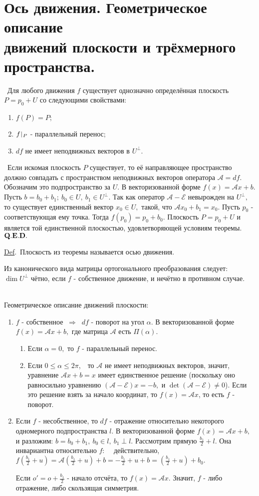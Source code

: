 \documentclass[a4paper]{article}%
\renewcommand{\de}{\par\noindent\underline{Def}.\ }%
\renewcommand{\ab}{\par\noindent}%
\newcommand{\te}{\par\noindent{\bf Теорема.}\ }%
\newcommand{\dok}{\par\noindent{\textsl{Доказательство}.}\ }%
\newcommand{\qed}{\quad${{\bf Q.E.D.}}$}
\renewcommand{\om}[1]{\mathcal{#1}}
\renewcommand{\le}{\leqslant}
\begin{document}
\section{Ось движения. Геометрическое описание\\ движений плоскости и трёхмерного пространства.}
\label{q48}
\te Для любого движения $f$ существует однозначно определённая плоскость $P=p_0+U$ со следующими свойствами:
\begin{enumerate}
    \item $f(P)=P;$
    \item $f\,\vrule\,_P$ - параллельный перенос;
    \item $df$ не имеет неподвижных векторов в $U^\bot.$
\end{enumerate}
\dok Если искомая плоскость $P$ существует, то её направляющее пространство должно совпадать с пространством
неподвижных векторов оператора $\om{A}=df.$ Обозначим это подпространство за $U$. В векторизованной форме $f(x)=\om{A}x+b.$
Пусть $b=b_0+b_1;\ b_0\in U,\ b_1\in U^\bot.$ Так как оператор $\om{A-E}$ невырожден на $U^\bot,$ то существует единственный
вектор $x_0\in U,$ такой, что $\om{A}x_0+b_1=x_0.$ Пусть $p_0$ - соответствующая ему точка. Тогда $f(p_0)=p_0+b_0.$ Плоскость
$P=p_0+U$ и является той единственной плоскостью, удовлетворяющей условиям теоремы.\qed
\de Плоскость из теоремы называется осью движения.
\ab Из канонического вида матрицы ортогонального преобразования следует:\\ $\dim U^\bot$ чётно, если $f$ - собственное
движение, и нечётно в противном случае.
\ab\\ Геометрическое описание движений плоскости:
\begin{enumerate}
    \item $f$ - собственное $\ \Rightarrow\ $ $df$ - поворот на угол $\alpha.$ В векторизованной форме $f(x)=\om{A}x+b,$ где
    матрица $\om{A}$ есть $\Pi(\alpha).$
    \begin{enumerate}
        \item Если $\alpha=0,$ то $f$ - параллельный перенос.
        \item Если $0\le \alpha\le 2\pi$,\ \ то $\om{A}$ не имеет неподвижных векторов, значит, уравнение $\om{A}x+b=x$
    имеет единственное решение (поскольку оно равносильно уравнению $(\om{A-E})x=-b,$ и $\det(\om{A-E})\ne 0$). Если это
    решение взять за начало координат, то $f(x)=\om{A}x$, то есть $f$ - поворот.
    \end{enumerate}
    \item Если $f$ - несобственное, то $df$ - отражение относительно некоторого одномерного подпространства $l$. В векторизованной форме
    $f(x)=\om{A}x+b,$ и разложим: $b=b_0+b_1,\ b_0\in l,\ b_1\perp l.$ Рассмотрим прямую $\frac{b_1}{2}+l.$ Она инвариантна относительно $f$:
    \ \ действительно, \\
    $f(\frac{b_1}2+u)=\om{A}(\frac{b_1}2+u)+b=-\frac{b_1}2+u+b=(\frac{b_1}2+u)+b_0.$
    \ab Если $o'=o+\frac{b_1}2$ - начало отсчёта, то $f(x)=\om{A}x.$ Значит, $f$ - либо отражение, либо скользящая симметрия.
\end{enumerate}
\end{document}
